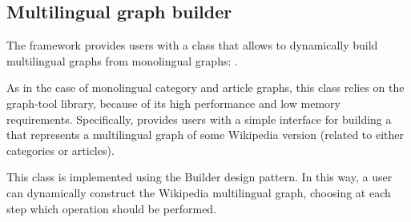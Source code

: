         \subsection{Multilingual graph builder}\label{multilingualbuilder}
            The framework provides users with a class that allows to dynamically build multilingual graphs from monolingual graphs: .
            
            As in the case of monolingual category and article graphs, this class relies on the graph-tool library, because of its high performance and low memory requirements. Specifically,  provides users with a simple interface for building a  that represents a multilingual graph of some Wikipedia version (related to either categories or articles).
            
            This class is implemented using the Builder design pattern. In this way, a user can dynamically construct the Wikipedia multilingual graph, choosing at each step which operation should be performed.
            
